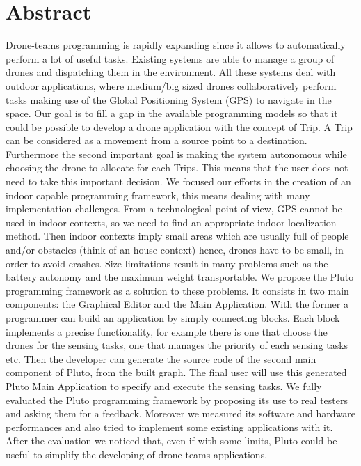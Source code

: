 \chapter*{Abstract}


Drone-teams programming is rapidly expanding since it allows to automatically perform a lot of useful tasks.
Existing systems are able to manage a group of drones and dispatching them in the environment. 
All these systems deal with outdoor applications, where medium/big sized drones collaboratively perform tasks making use of the Global Positioning System (GPS) to navigate in the space.
Our goal is to fill a gap in the available programming models so that it could be possible to develop a drone application with the concept of Trip. A Trip can be considered as a movement from a source point to a destination.
Furthermore the second important goal is making the system autonomous while choosing the drone to allocate for each Trips. This means that the user does not need to take this important decision.
We focused our efforts in the creation of an indoor capable programming framework, this means dealing with many implementation challenges.
From a technological point of view, GPS cannot be used in indoor contexts, so we need to find an appropriate indoor localization method.
Then indoor contexts imply small areas which are usually full of people and/or obstacles (think of an house context) hence, drones have to be small, in order to avoid crashes.
Size limitations result in many problems such as the battery autonomy and the maximum weight transportable.
We propose the Pluto programming framework as a solution to these problems. It consists in two main components: the Graphical Editor and the Main Application. With the former a programmer can build an application by simply connecting blocks.
Each block implements a precise functionality, for example there is one that choose the drones for the sensing tasks, one that manages the priority of each sensing tasks etc.
Then the developer can generate the source code  of the second main component of Pluto, from the built graph. The final user will use this generated Pluto Main Application to specify and execute the sensing tasks.
We fully evaluated the Pluto programming framework by proposing its use to real testers and asking them for a feedback. Moreover we measured its software and hardware performances and also tried to implement some existing applications with it.
After the evaluation we noticed that, even if with some limits, Pluto could be useful to simplify the developing of drone-teams applications.



